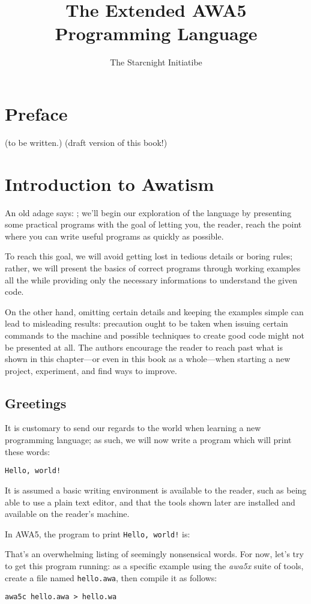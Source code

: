 \documentclass[11pt,a4paper,draft]{book}
\author{The Starcnight Initiatibe}
\title{The Extended AWA5 Programming Language}
\begin{document}
\frontmatter
\tableofcontents

\chapter{Preface}
(to be written.)
(draft version of this book!)

\mainmatter
\chapter{Introduction to Awatism}
An old adage says:
;
we'll begin our exploration of the language by presenting some
practical programs with the goal of letting you, the reader, reach the
point where you can write useful programs as quickly as possible.

To reach this goal, we will avoid getting lost in tedious details or
boring rules; rather, we will present the basics of correct programs
through working examples all the while providing only the necessary
informations to understand the given code.

On the other hand, omitting certain details and keeping the examples
simple can lead to misleading results: precaution ought to be taken
when issuing certain commands to the machine and possible techniques
to create good code might not be presented at all. The authors
encourage the reader to reach past what is shown in this chapter---or
even in this book as a whole---when starting a new project,
experiment, and find ways to improve.

\section{Greetings}
It is customary to send our regards to the world when learning a new
programming language; as such, we will now write a program which will
print these words:
\begin{verbatim}
Hello, world!
\end{verbatim}

It is assumed a basic writing environment is available to the reader,
such as being able to use a plain text editor, and that the tools
shown later are installed and available on the reader's machine.

In AWA5, the program to print \verb|Hello, world!| is:


That's an overwhelming listing of seemingly nonsensical words. For
now, let's try to get this program running: as a specific example
using the \emph{awa5x} suite of tools, create a file named
\verb|hello.awa|, then compile it as follows:
\begin{verbatim}
awa5c hello.awa > hello.wa
\end{verbatim}
\end{document}
